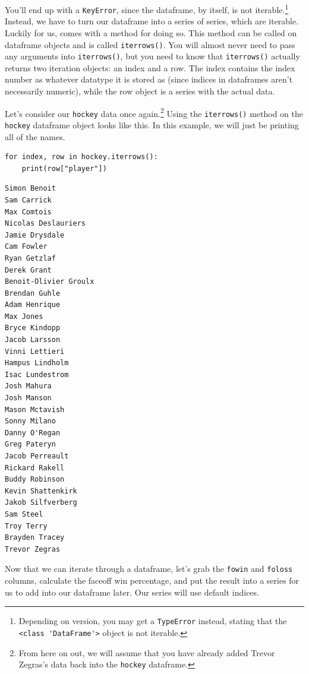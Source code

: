 You'll end up with a \verb|KeyError|, since the dataframe, by itself, is not iterable.\cprotect\footnote{Depending on  version, you may get a \verb|TypeError| instead, stating that the \verb|<class 'DataFrame'>| object is not iterable.} Instead, we have to turn our dataframe into a series of series, which are iterable. Luckily for us,  comes with a method for doing so. This method can be called on dataframe objects and is called \verb|iterrows()|. You will almost never need to pass any arguments into \verb|iterrows()|, but you need to know that \verb|iterrows()| actually returns two iteration objects: an index and a row. The index contains the index number as whatever datatype it is stored as (since indices in dataframes aren't necessarily numeric), while the row object is a series with the actual data.\par
Let's consider our \verb|hockey| data once again.\cprotect\footnote{From here on out, we will assume that you have already added Trevor Zegras's data back into the \verb|hockey| dataframe.} Using the \verb|iterrows()| method on the \verb|hockey| dataframe object looks like this. In this example, we will just be printing all of the names.\par
\begin{lstlisting}[style=pippython]
for index, row in hockey.iterrows():
	print(row["player"])
\end{lstlisting}
\begin{lstlisting}[style=none]
Simon Benoit
Sam Carrick
Max Comtois
Nicolas Deslauriers
Jamie Drysdale
Cam Fowler
Ryan Getzlaf
Derek Grant
Benoit-Olivier Groulx
Brendan Guhle
Adam Henrique
Max Jones
Bryce Kindopp
Jacob Larsson
Vinni Lettieri
Hampus Lindholm
Isac Lundestrom
Josh Mahura
Josh Manson
Mason Mctavish
Sonny Milano
Danny O'Regan
Greg Pateryn
Jacob Perreault
Rickard Rakell
Buddy Robinson
Kevin Shattenkirk
Jakob Silfverberg
Sam Steel
Troy Terry
Brayden Tracey
Trevor Zegras
\end{lstlisting}
Now that we can iterate through a dataframe, let's grab the \verb|fowin| and \verb|foloss| columns, calculate the faceoff win percentage, and put the result into a  series for us to add into our dataframe later. Our series will use default indices.\par
